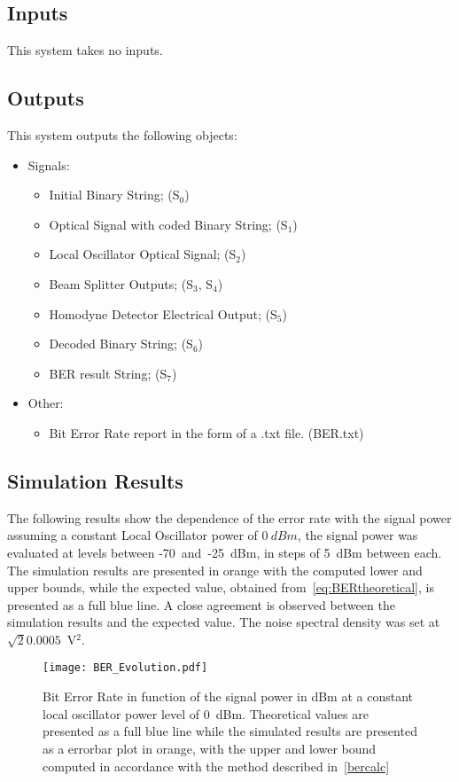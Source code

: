 \subsection*{Inputs}

This system takes no inputs.

\subsection*{Outputs}

This system outputs the following objects:
\begin{itemize}
\item Signals:
\begin{itemize}
\item Initial Binary String; (S$_0$)
\item Optical Signal with coded Binary String; (S$_{1}$)
\item Local Oscillator Optical Signal; (S$_{2}$)
\item Beam Splitter Outputs; (S$_{3}$, S$_{4}$)
\item Homodyne Detector Electrical Output; (S$_{5}$)
\item Decoded Binary String; (S$_{6}$)
\item BER result String; (S$_{7}$)
\end{itemize}
\item Other:
\begin{itemize}
\item Bit Error Rate report in the form of a .txt file. (BER.txt)
\end{itemize}
\end{itemize}

\subsection*{Simulation Results}

The following results show the dependence of the error rate with the signal power assuming a constant Local Oscillator power of $0~dBm$, the signal power was evaluated at levels between -70~and~-25~dBm, in steps of 5~dBm between each. The simulation results are presented in orange with the computed lower and upper bounds, while the expected value, obtained from~\eqref{eq:BERtheoretical}, is presented as a full blue line. A close agreement is observed between the simulation results and the expected value. The noise spectral density was set at $\sqrt{2}0.0005$~V$^2$. 
\begin{figure}[H]
\centering
\texttt{[image: BER\_Evolution.pdf]}
\caption{Bit Error Rate in function of the signal power in dBm at a constant local oscillator power level of 0~dBm. Theoretical values are presented as a full blue line while the simulated results are presented as a errorbar plot in orange, with the upper and lower bound computed in accordance with the method described in~\ref{bercalc}}
\label{fig:berevolution}
\end{figure}